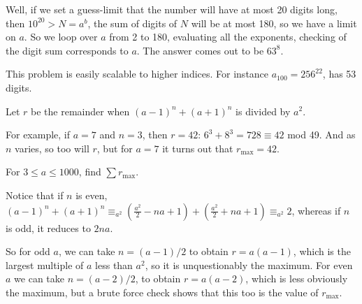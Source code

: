 Well, if we set a guess-limit that the number will have at most 20 digits long, then $10^{20} > N = a^b$, the sum of digits of $N$ will be at most 180, so we have a limit on $a$.  So we loop over $a$ from 2 to 180, evaluating all the exponents, checking of the digit sum corresponds to $a$.  The answer comes out to be $63^8$.

\footnotesize
This problem is easily scalable to higher indices.  For instance $a_{100} = 256^{22}$, has 53 digits.
\normalsize




Let $r$ be the remainder when $(a-1)^n + (a+1)^n$ is divided by $a^2$.

For example, if $a = 7$ and $n = 3$, then $r = 42$: $6^3 + 8^3 = 728 \equiv 42$ mod 49. And as $n$ varies, so too will $r$, but for $a = 7$ it turns out that $r_\text{max} = 42$.

For $3 \leq a \leq 1000$, find $\sum  r_\text{max}$.

Notice that if $n$ is even, $(a-1)^n + (a+1)^n \equiv_{a^2} (\tfrac{a^2}2 - na + 1)+(\tfrac{a^2}2 + na + 1) \equiv_{a^2} 2$,
whereas if $n$ is odd, it reduces to $2na$.  

So for odd $a$, we can take $n = (a-1)/2$ to obtain $r = a(a-1)$, which is the largest multiple of $a$ less than $a^2$, so it is unquestionably the maximum.  For even $a$ we can take $n = (a-2)/2$, to obtain $r = a(a-2)$, which is less obviously the maximum, but a brute force check shows that this too is the value of $r_\text{max}$.


